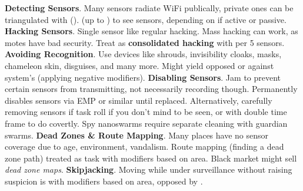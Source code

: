 \begin{itemize}
   \itembox \textbf{Detecting Sensors}. Many sensors radiate WiFi publically, private ones can be triangulated with  ().  (up to ) to see sensors, depending on if active or passive.
   \itembox \textbf{Hacking Sensors}. Single sensor like regular hacking. Mass hacking can work, as motes have bad security. Treat as \textbf{consolidated hacking} with  per \num{5} sensors.
   \itembox \textbf{Avoiding Recognition}. Use devices like shrouds, invisibility cloaks, masks, chameleon skin, disguises, and many more. Might yield opposed  or  against system's  (applying negative modifiers).
   \itembox \textbf{Disabling Sensors}. Jam to prevent certain sensors from transmitting, not necessarily recording though. Permanently disables sensors via EMP or similar until replaced. Alternatively, carefully removing sensors if task  roll if you don't mind to be seen, or  with double time frame to do covertly. Spy nanoswarms require separate cleaning with guardian swarms.
   \itembox \textbf{Dead Zones \& Route Mapping}. Many places have no sensor coverage due to age, environment, vandalism. Route mapping (finding a dead zone path) treated as task  with modifiers based on area. Black market might sell \textit{dead zone maps}.
   \itembox \textbf{Skipjacking}. Moving while under surveillance without raising suspicion is  with modifiers based on area, opposed by .
\end{itemize}